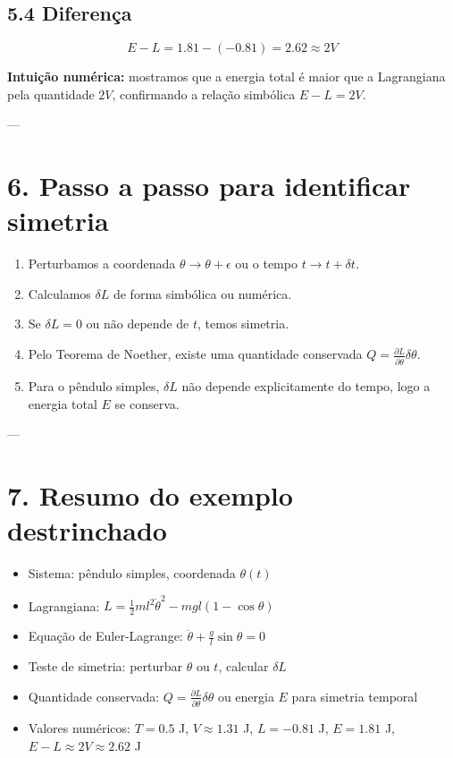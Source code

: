 \documentclass[12pt]{article}
\begin{document}
\subsection*{5.4 Diferença}
\[
E - L = 1.81 - (-0.81) = 2.62 \approx 2V
\]

\textbf{Intuição numérica:} mostramos que a energia total é maior que a Lagrangiana pela quantidade $2V$, confirmando a relação simbólica $E - L = 2V$.

---

\section*{6. Passo a passo para identificar simetria}

\begin{enumerate}
    \item Perturbamos a coordenada $\theta \to \theta + \epsilon$ ou o tempo $t \to t + \delta t$.
    \item Calculamos $\delta L$ de forma simbólica ou numérica.
    \item Se $\delta L = 0$ ou não depende de $t$, temos simetria.
    \item Pelo Teorema de Noether, existe uma quantidade conservada $Q = \frac{\partial L}{\partial \dot{\theta}} \delta \theta$.
    \item Para o pêndulo simples, $\delta L$ não depende explicitamente do tempo, logo a energia total $E$ se conserva.
\end{enumerate}

---

\section*{7. Resumo do exemplo destrinchado}

\begin{itemize}
    \item Sistema: pêndulo simples, coordenada $\theta(t)$
    \item Lagrangiana: $L = \frac{1}{2} m l^2 \dot{\theta}^2 - m g l (1 - \cos\theta)$
    \item Equação de Euler-Lagrange: $\ddot{\theta} + \frac{g}{l} \sin\theta = 0$
    \item Teste de simetria: perturbar $\theta$ ou $t$, calcular $\delta L$
    \item Quantidade conservada: $Q = \frac{\partial L}{\partial \dot{\theta}} \delta \theta$ ou energia $E$ para simetria temporal
    \item Valores numéricos: $T = 0.5$ J, $V \approx 1.31$ J, $L = -0.81$ J, $E = 1.81$ J, $E-L \approx 2V \approx 2.62$ J
\end{itemize}
\end{document}
